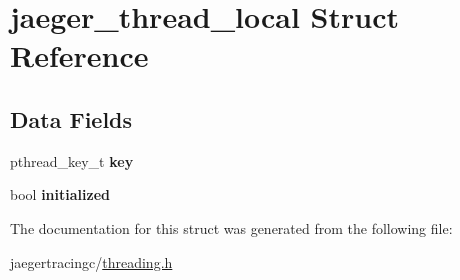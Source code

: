 \hypertarget{structjaeger__thread__local}{}\section{jaeger\+\_\+thread\+\_\+local Struct Reference}
\label{structjaeger__thread__local}
\subsection*{Data Fields}
\begin{DoxyCompactItemize}
\item 
\mbox{\label{structjaeger__thread__local_a5c2963fb2a23a5d7a7c74cd6781fd6a9}} 
pthread\+\_\+key\+\_\+t {\bfseries key}
\item 
\mbox{\label{structjaeger__thread__local_a7c96bea598a3e648891d6499f2b02038}} 
bool {\bfseries initialized}
\end{DoxyCompactItemize}


The documentation for this struct was generated from the following file\+:\begin{DoxyCompactItemize}
\item 
jaegertracingc/\mbox{\hyperlink{threading_8h}{threading.\+h}}\end{DoxyCompactItemize}
